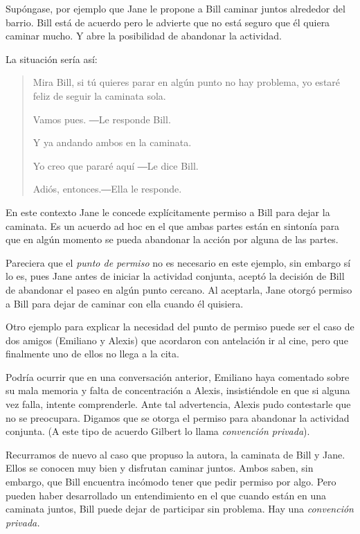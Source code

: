\documentclass[oneside]{book}
\begin{document}
Supóngase, por ejemplo que Jane le propone a Bill caminar juntos alrededor del barrio. Bill está de acuerdo pero le advierte que no está seguro que él quiera caminar mucho. Y abre la posibilidad de abandonar la actividad.

La situación sería así:
\begin{quote}
Mira Bill, si tú quieres parar en algún punto no hay problema, yo estaré feliz de seguir la caminata sola. 

Vamos pues. ―Le responde Bill.

Y ya andando ambos en la caminata. 

Yo creo que pararé aquí ―Le dice Bill.

Adiós, entonces.―Ella le responde. 
\end{quote}

En este contexto Jane le concede explícitamente permiso a Bill para dejar la caminata. Es un acuerdo ad hoc en el que ambas partes están en sintonía para que en algún momento se pueda abandonar la acción por alguna de las partes.

Pareciera que el \textit{punto de permiso} no es necesario en este ejemplo, sin embargo sí lo es, pues Jane antes de iniciar la actividad conjunta, aceptó la decisión de Bill de abandonar el paseo en algún punto cercano. Al aceptarla, Jane otorgó permiso a Bill para dejar de caminar con ella cuando él quisiera.

Otro ejemplo para explicar la necesidad del punto de permiso puede ser el caso de dos amigos (Emiliano y Alexis) que acordaron con antelación ir al cine, pero que finalmente uno de ellos no llega a la cita.

Podría ocurrir que en una conversación anterior, Emiliano haya comentado sobre su mala memoria y falta de concentración a Alexis, insistiéndole en que si alguna vez falla, intente comprenderle. Ante tal advertencia, Alexis pudo contestarle que no se preocupara. Digamos que se otorga el permiso para abandonar la actividad conjunta. (A este tipo de acuerdo Gilbert lo llama \textit{convención privada}).

Recurramos de nuevo al caso que propuso la autora, la caminata de Bill y Jane. Ellos se conocen muy bien y disfrutan caminar juntos. Ambos saben, sin embargo, que Bill encuentra incómodo tener que pedir permiso por algo. Pero pueden haber desarrollado un entendimiento en el que cuando están en una caminata juntos, Bill puede dejar de participar sin problema. Hay una \textit{convención privada. }
\end{document}
